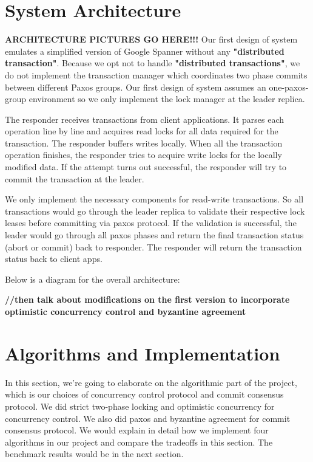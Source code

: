 \documentclass[10pt,twocolumn]{article}
\begin{document}
\section{System Architecture}
 \textbf{ARCHITECTURE PICTURES GO HERE!!!}
Our first design of system emulates a simplified version of Google Spanner without any \textbf{ "distributed transaction"}. Because we opt not to handle \textbf{"distributed transactions"}, we do not implement the transaction manager which coordinates two phase commits between different Paxos groups. Our first design of system assumes an one-paxos-group environment so we only implement the lock manager at the leader replica.

The responder receives transactions from client applications. It parses each operation line by line and acquires read locks for all data required for the transaction. The responder buffers writes locally. When all the transaction operation finishes, the responder tries to acquire write locks for the locally modified data. If the attempt turns out successful, the responder will try to commit the transaction at the leader. 

We only implement the necessary components for read-write transactions. So all transactions would go through the leader replica to validate their respective lock leases before committing via paxos protocol. If the validation is successful, the leader would go through all paxos phases and return the final transaction status (abort or commit) back to responder. The responder will return the transaction status back to client apps.

Below is a diagram for the overall architecture:

\textbf{//then talk about modifications on the first version to incorporate optimistic concurrency control and byzantine agreement}


\section{Algorithms and Implementation}
In this section, we're going to elaborate on the algorithmic part of the project, which is our choices of concurrency control protocol and commit consensus protocol. We did strict two-phase locking and optimistic concurrency for concurrency control. We also did paxos and byzantine agreement for commit consensus protocol. We would explain in detail how we implement four algorithms in our project and compare the tradeoffs in this section. The benchmark results would be in the next section.
\end{document}
